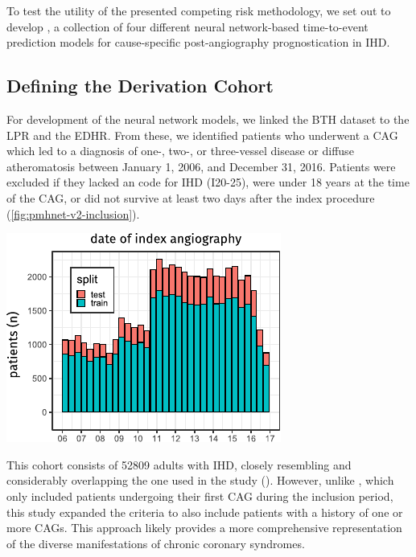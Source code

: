 To test the utility of the presented competing risk methodology,
we set out to develop , a collection of four different 
neural network-based time-to-event prediction models for cause-specific 
post-angiography prognostication in \ac{IHD}.

\subsection{Defining the Derivation Cohort}

For development of the neural network models, 
we linked the \ac{BTH} dataset to 
the \ac{LPR} and the \ac{EDHR}.
From these, 
we identified patients who underwent a \ac{CAG} which led to a diagnosis of
one-, two-, or three-vessel disease or diffuse atheromatosis between January 1,
2006, and December 31, 2016.
Patients were excluded if they lacked an
 code for \ac{IHD} (I20-25),
were under 18 years at the time of the \ac{CAG},
or did not survive at least two days after the index procedure
(\cref{fig:pmhnet-v2-inclusion}).

\begin{marginfigure}[0em]%
    \includegraphics[trim=5mm 0 0 0]{graphics/pmhnet-v2-inclusion-histogram.pdf}
    \caption[Distribution of  inclusion times]{%
    Histogram showing the temporal distribution of the  index
    coronary angiography procedures. 
    The bars represent the number of patients with an index event in each
    four-month period from 2006 to 2017,
    further segmented to display the proportions of train and test patients.}
    \label{fig:pmhnet-v2-histo}
\end{marginfigure}

This cohort consists of \num{52809} adults with \ac{IHD}, 
closely resembling and considerably overlapping  
the one used in the  study (\studyii{}).
However, unlike , 
which only included 
patients undergoing their first \ac{CAG} 
during the inclusion period,
this study expanded the criteria to 
also include patients with a history of one or more \acp{CAG}.
This approach likely provides 
a more comprehensive representation 
of the diverse manifestations of chronic coronary syndromes.

